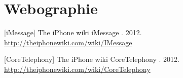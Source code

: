 


\cleardoublepage



\chapter*{Webographie}

\thispagestyle{empty}



[iMessage] The iPhone wiki \og iMessage \fg. 2012. \href{http://theiphonewiki.com/wiki/IMessage}{http://theiphonewiki.com/wiki/IMessage}

[CoreTelephony] The iPhone wiki \og CoreTelephony \fg. 2012. \href{http://theiphonewiki.com/wiki/CoreTelephony}{http://theiphonewiki.com/wiki/CoreTelephony}
